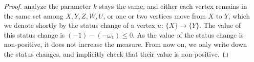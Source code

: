 \documentclass{llncs}
\begin{document}
{\begin{proof}
                                                                                                                                                      
                                                                                                                                                      
                                                                                                                                                      
                                                                                                                                                      
                                                                                                                                                      
                                                                                                                                                      
                                                                                                                                                      
                                                                                                                                                      
                                                                                                                                                      
                                                                                                                                                      
                                                                                                                                                      
                                                                                                                                                      
                                                                             analyze the parameter $k$ stays the same, and either each vertex remains
in the same set among $X,Y,Z,W,U$, or one or two vertices move from $X$ to $Y$, which we denote shortly by the status change of a vertex $u$: $\{X\}
\rightarrow \{Y\}$. The value of this status change is $(-1) - (-\omega_1) \le 0$. As the value of the status change is non-positive, it does not
increase the measure. From now on, we only write down the status changes, and implicitly check that their value is non-positive.
 

\end{proof}}
\end{document}
